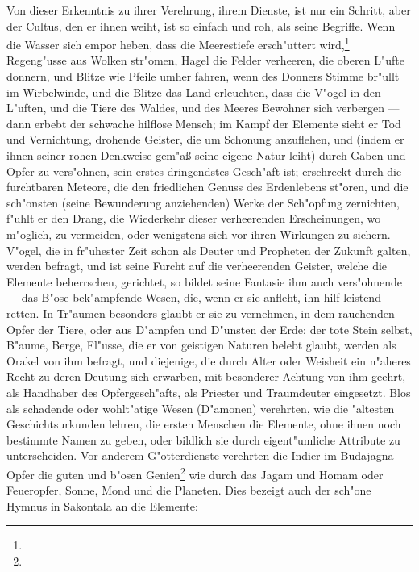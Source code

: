 \documentclass[a4paper, 11pt, oneside, polutonikogreek, german]{article}
\begin{document}
Von dieser Erkenntnis zu ihrer Verehrung, ihrem Dienste, ist nur ein Schritt, aber der Cultus, den er ihnen weiht, ist so einfach und roh, als seine Begriffe. Wenn die Wasser sich empor heben, dass die Meerestiefe ersch"uttert wird,\footnote{} Regeng"usse aus Wolken str"omen, Hagel die Felder verheeren, die oberen L"ufte donnern, und Blitze wie Pfeile umher fahren, wenn des Donners Stimme br"ullt im Wirbelwinde, und die Blitze das Land erleuchten, dass die V"ogel in den L"uften, und die Tiere des Waldes, und des Meeres Bewohner sich verbergen --- dann erbebt der schwache hilflose Mensch; im Kampf der Elemente sieht er Tod und Vernichtung, drohende Geister, die um Schonung anzuflehen, und (indem er ihnen seiner rohen Denkweise gem"aß seine eigene Natur leiht) durch Gaben und Opfer zu vers"ohnen, sein erstes dringendstes Gesch"aft ist; erschreckt durch die furchtbaren Meteore, die den friedlichen Genuss des Erdenlebens st"oren, und die sch"onsten (seine Bewunderung anziehenden) Werke der Sch"opfung zernichten, f"uhlt er den Drang, die Wiederkehr dieser verheerenden Erscheinungen, wo m"oglich, zu vermeiden, oder wenigstens sich vor ihren Wirkungen zu sichern. V"ogel, die in fr"uhester Zeit schon als Deuter und Propheten der Zukunft galten, werden befragt, und ist seine Furcht auf die verheerenden Geister, welche die Elemente beherrschen, gerichtet, so bildet seine Fantasie ihm auch vers"ohnende --- das B"ose bek"ampfende Wesen, die, wenn er sie anfleht, ihn hilf leistend retten. In Tr"aumen besonders glaubt er sie zu vernehmen, in dem rauchenden Opfer der Tiere, oder aus D"ampfen und D"unsten der Erde; der tote Stein selbst, B"aume, Berge, Fl"usse, die er von geistigen Naturen belebt glaubt, werden als Orakel von ihm befragt, und diejenige, die durch Alter oder Weisheit ein n"aheres Recht zu deren Deutung sich erwarben, mit besonderer Achtung von ihm geehrt, als Handhaber des Opfergesch"afts, als Priester und Traumdeuter eingesetzt. Blos als schadende oder wohlt"atige Wesen (D"amonen) verehrten, wie die "altesten Geschichtsurkunden lehren, die ersten Menschen die Elemente, ohne ihnen noch bestimmte Namen zu geben, oder bildlich sie durch eigent"umliche Attribute zu unterscheiden. Vor anderem G"otterdienste verehrten die Indier im Budajagna-Opfer die guten und b"osen Genien\footnote{} wie durch das Jagam und Homam oder Feueropfer, Sonne, Mond und die Planeten. Dies bezeigt auch der sch"one Hymnus in Sakontala an die Elemente:
\vspace{9pt}
\end{document}
